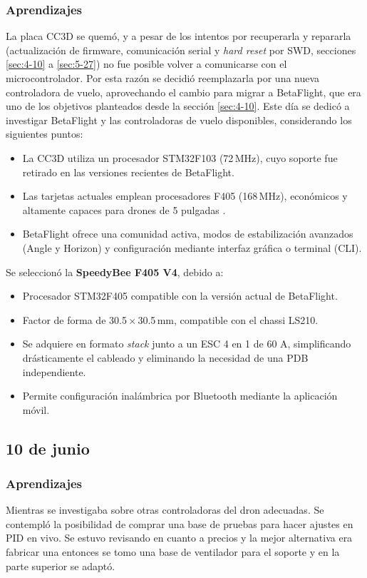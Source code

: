 \documentclass[pdflatex,sn-mathphys-num]{sn-jnl}%
\begin{document}
\subsubsection{Aprendizajes}
La placa CC3D se quemó, y a pesar de los intentos por recuperarla y repararla (actualización de firmware, comunicación serial y \textit{hard reset} por SWD, secciones \ref{sec:4-10} a \ref{sec:5-27}) no fue posible volver a comunicarse con el microcontrolador. Por esta razón se decidió reemplazarla por una nueva controladora de vuelo, aprovechando el cambio para migrar a BetaFlight, que era uno de los objetivos planteados desde la sección \ref{sec:4-10}. Este día se dedicó a investigar BetaFlight y las controladoras de vuelo disponibles, considerando los siguientes puntos:
\begin{itemize}
    \item La CC3D utiliza un procesador STM32F103 (72\,MHz), cuyo soporte fue retirado en las versiones recientes de BetaFlight.
    \item Las tarjetas actuales emplean procesadores F405 (168\,MHz), económicos y altamente capaces para drones de 5 pulgadas \cite{stm32ventajas}.
    \item BetaFlight ofrece una comunidad activa, modos de estabilización avanzados (Angle y Horizon) y configuración mediante interfaz gráfica o terminal (CLI).
\end{itemize}

Se seleccionó la \textbf{SpeedyBee F405 V4}, debido a:
\begin{itemize}
    \item Procesador STM32F405 compatible con la versión actual de BetaFlight.
    \item Factor de forma de 30.5\,$\times$\,30.5\,mm, compatible con el chassi LS210.
    \item Se adquiere en formato \textit{stack} junto a un ESC 4 en 1 de 60 A, simplificando drásticamente el cableado y eliminando la necesidad de una PDB independiente.
    \item Permite configuración inalámbrica por Bluetooth mediante la aplicación móvil.
\end{itemize}


\subsection{10 de junio}
\subsubsection{Aprendizajes}
Mientras se investigaba sobre otras controladoras del dron adecuadas. Se contempló la posibilidad de comprar una base de pruebas para hacer ajustes en PID en vivo. Se estuvo revisando en cuanto a precios y la mejor alternativa era fabricar una entonces se tomo una base de ventilador para el soporte y en la parte superior se adaptó.
\end{document}
